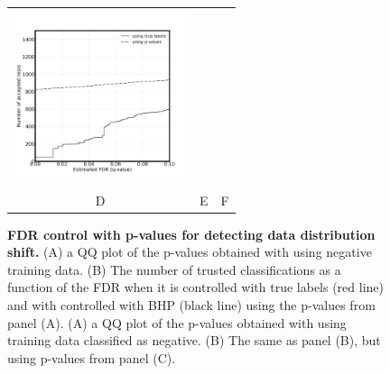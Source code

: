 \documentclass{article}
\begin{document}
\begin{figure}
\begin{tabular}{ccc}
            \includegraphics[width=2in]{img/shift_test_pred_no_labels_loc.png}  \\
		D & E & F \\
	\end{tabular}
	\caption{{\bf  FDR control with p-values for detecting data distribution shift.}
		(A) a QQ plot of the p-values obtained with using negative training data. (B) The number of trusted classifications as a function of the FDR when it is controlled with true labels (red line) and with controlled with BHP (black line) using the p-values from panel (A).
		(A) a QQ plot of the p-values obtained with using training data classified as negative. (B) The same as panel (B), but using p-values from panel (C).
	}
	\label{fig:examplesssss}
\end{figure}
\end{document}
